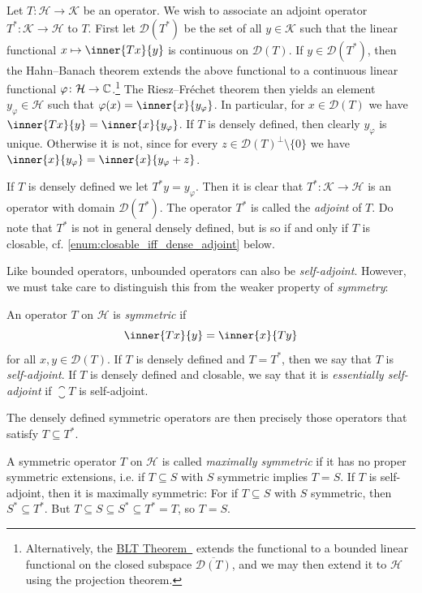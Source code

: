 \documentclass[article, a4paper, 11pt, oneside]{memoir}
\let\phi\varphi
\numberwithin{equation}{chapter}
\newcommand{\calH}{\mathcal{H}}
\newcommand{\calK}{\mathcal{K}}
\newcommand{\dom}{\mathcal{D}}
\theoremstyle{myexample}
\theoremstyle{myexample}
\theoremstyle{myexamplebreak}
\theoremstyle{myexamplebreak}
\theoremstyle{nonumberplain}
\theoremstyle{MyNonumberplain}
\newcommand{\mynameref}[2]{%
    \hyperref[#1]{#2~\labelcref*{#1}}%
}
\begin{document}
Let $T \colon \calH \to \calK$ be an operator. We wish to associate an adjoint operator $T^* \colon \calK \to \calH$ to $T$. First let $\dom(T^*)$ be the set of all $y \in \calK$ such that the linear functional $x \mapsto \inner{Tx}{y}$ is continuous on $\dom(T)$. If $y \in \dom(T^*)$, then the Hahn--Banach theorem extends the above functional to a continuous linear functional $\phi \colon \calH \to \setC$.\footnote{Alternatively, the \mynameref{thm:blt}{BLT Theorem} extends the functional to a bounded linear functional on the closed subspace $\overline{\dom(T)}$, and we may then extend it to $\calH$ using the projection theorem.} The Riesz--Fréchet theorem then yields an element $y_\phi \in \calH$ such that $\phi(x) = \inner{x}{y_\phi}$. In particular, for $x \in \dom(T)$ we have $\inner{Tx}{y} = \inner{x}{y_\phi}$. If $T$ is densely defined, then clearly $y_\phi$ is unique. Otherwise it is not, since for every $z \in \dom(T)^\perp \setminus \{0\}$ we have $\inner{x}{y_\phi} = \inner{x}{y_\phi + z}$.

If $T$ is densely defined we let $T^*y = y_\phi$. Then it is clear that $T^* \colon \calK \to \calH$ is an operator with domain $\dom(T^*)$. The operator $T^*$ is called the \emph{adjoint} of $T$. Do note that $T^*$ is not in general densely defined, but is so if and only if $T$ is closable, cf. \cref{enum:closable_iff_dense_adjoint} below.

Like bounded operators, unbounded operators can also be \emph{self-adjoint}. However, we must take care to distinguish this from the weaker property of \emph{symmetry}:

\begin{definition}
    An operator $T$ on $\calH$ is \emph{symmetric} if
    \begin{equation*}
        \inner{Tx}{y} = \inner{x}{Ty}
    \end{equation*}
    for all $x, y \in \dom(T)$. If $T$ is densely defined and $T = T^*$, then we say that $T$ is \emph{self-adjoint}. If $T$ is densely defined and closable, we say that it is \emph{essentially self-adjoint} if $\closure{T}$ is self-adjoint.
\end{definition}
%
The densely defined symmetric operators are then precisely those operators that satisfy $T \subseteq T^*$.

A symmetric operator $T$ on $\calH$ is called \emph{maximally symmetric} if it has no proper symmetric extensions, i.e. if $T \subseteq S$ with $S$ symmetric implies $T = S$. If $T$ is self-adjoint, then it is maximally symmetric: For if $T \subseteq S$ with $S$ symmetric, then $S^* \subseteq T^*$. But $T \subseteq S \subseteq S^* \subseteq T^* = T$, so $T = S$.
\end{document}
